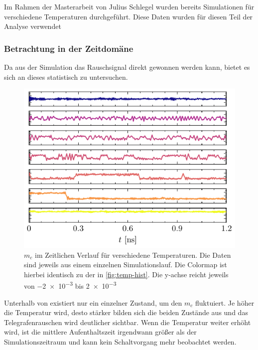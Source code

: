 \documentclass[main.tex]{subfiles}
\begin{document}
Im Rahmen der Masterarbeit von Julius Schlegel \cite{schlegel-master} wurden bereits Simulationen für verschiedene Temperaturen durchgeführt. Diese Daten wurden für diesen Teil der Analyse verwendet

\subsubsection{Betrachtung in der Zeitdomäne}

Da aus der Simulation das Rauschsignal direkt gewonnen werden kann, bietet es sich an dieses statistisch zu untersuchen.

\begin{figure}[H]
    \centering
    \includegraphics{bilder/plots/temp_comparison_long/mc_time.pdf}
    \caption{\(m_c\) im Zeitlichen Verlauf für verschiedene Temperaturen. Die Daten sind jeweils aus einem einzelnen Simulationslauf. Die Colormap ist hierbei identisch zu der in \cref{fig:temp-hist}. Die y-achse reicht jeweils von \num{-2e-3} bis \num{+2e-3}}\label{fig:temp-time}
\end{figure}

Unterhalb von  existiert nur ein einzelner Zustand, um den \(m_c\) fluktuiert. Je höher die Temperatur wird, desto stärker bilden sich die beiden Zustände aus und das Telegrafenrauschen wird deutlicher sichtbar. Wenn die Temperatur weiter erhöht wird, ist die mittlere Aufenthaltszeit irgendwann größer als der Simulationszeitraum und kann kein Schaltvorgang mehr beobachtet werden.
\end{document}
